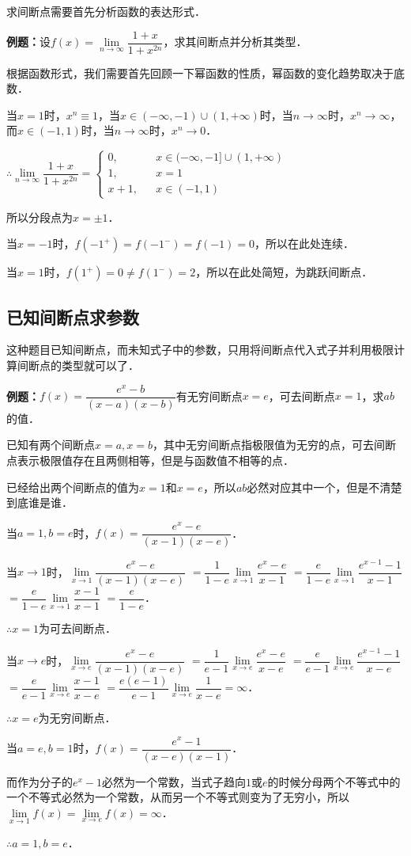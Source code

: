 求间断点需要首先分析函数的表达形式．

\textbf{例题：}设$f(x)=\lim\limits_{n\to\infty}\dfrac{1+x}{1+x^{2n}}$，求其间断点并分析其类型．

根据函数形式，我们需要首先回顾一下幂函数的性质，幂函数的变化趋势取决于底数．

当$x=1$时，$x^n\equiv 1$，当$x\in(-\infty,-1)\cup(1,+\infty)$时，当$n\to\infty$时，$x^n\to\infty$，而$x\in(-1,1)$时，当$n\to\infty$时，$x^n\to 0$．

$\therefore\lim\limits_{n\to\infty}\dfrac{1+x}{1+x^{2n}}=\left\{\begin{array}{lcl}
        0,   &  & x\in(-\infty,-1]\cup(1,+\infty) \\
        1,   &  & x=1                                        \\
        x+1, &  & x\in(-1,1)
    \end{array}
    \right.$

所以分段点为$x=\pm 1$．

当$x=-1$时，$f(-1^+)=f(-1^-)=f(-1)=0$，所以在此处连续．

当$x=1$时，$f(1^+)=0\neq f(1^-)=2$，所以在此处简短，为跳跃间断点．

\subsection{已知间断点求参数}

这种题目已知间断点，而未知式子中的参数，只用将间断点代入式子并利用极限计算间断点的类型就可以了．

\textbf{例题：}$f(x)=\dfrac{e^x-b}{(x-a)(x-b)}$有无穷间断点$x=e$，可去间断点$x=1$，求$ab$的值．

已知有两个间断点$x=a,x=b$，其中无穷间断点指极限值为无穷的点，可去间断点表示极限值存在且两侧相等，但是与函数值不相等的点．

已经给出两个间断点的值为$x=1$和$x=e$，所以$ab$必然对应其中一个，但是不清楚到底谁是谁．

当$a=1,b=e$时，$f(x)=\dfrac{e^x-e}{(x-1)(x-e)}$．

当$x\to 1$时，$\lim\limits_{x\to 1}\dfrac{e^x-e}{(x-1)(x-e)}$ $=\dfrac{1}{1-e}\lim\limits_{x\to 1}\dfrac{e^x-e}{x-1}$ $=\dfrac{e}{1-e}\lim\limits_{x\to 1}\dfrac{e^{x-1}-1}{x-1}$ $=\dfrac{e}{1-e}\lim\limits_{x\to 1}\dfrac{x-1}{x-1}$ $=\dfrac{e}{1-e}$．

$\therefore x=1$为可去间断点．

    当$x\to e$时，$\lim\limits_{x\to e}\dfrac{e^x-e}{(x-1)(x-e)}$ $=\dfrac{1}{e-1}\lim\limits_{x\to e}\dfrac{e^x-e}{x-e}$ $=\dfrac{e}{e-1}\lim\limits_{x\to e}\dfrac{e^{x-1}-1}{x-e}$ $=\dfrac{e}{e-1}\lim\limits_{x\to e}\dfrac{x-1}{x-e}$ $=\dfrac{e(e-1)}{e-1}\lim\limits_{x\to e}\dfrac{1}{x-e}=\infty$．

$\therefore x=e$为无穷间断点．

    当$a=e,b=1$时，$f(x)=\dfrac{e^x-1}{(x-e)(x-1)}$．

    而作为分子的$e^x-1$必然为一个常数，当式子趋向$1$或$e$的时候分母两个不等式中的一个不等式必然为一个常数，从而另一个不等式则变为了无穷小，所以$\lim\limits_{x\to 1}f(x)=\lim\limits_{x\to e}f(x)=\infty$．

$\therefore a=1,b=e$．

